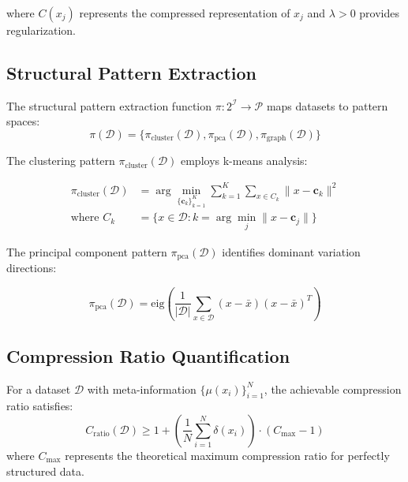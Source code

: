 where $C(x_j)$ represents the compressed representation of $x_j$ and $\lambda > 0$ provides regularization.

\subsection{Structural Pattern Extraction}

\begin{definition}
The structural pattern extraction function $\pi: 2^{\mathcal{I}} \to \mathcal{P}$ maps datasets to pattern spaces:
\begin{equation}
\pi(\mathcal{D}) = \{\pi_{\text{cluster}}(\mathcal{D}), \pi_{\text{pca}}(\mathcal{D}), \pi_{\text{graph}}(\mathcal{D})\}
\label{eq:structural-patterns}
\end{equation}
\end{definition}

The clustering pattern $\pi_{\text{cluster}}(\mathcal{D})$ employs k-means analysis:

\begin{align}
\pi_{\text{cluster}}(\mathcal{D}) &= \arg\min_{\{\mathbf{c}_k\}_{k=1}^K} \sum_{k=1}^K \sum_{x \in C_k} \|x - \mathbf{c}_k\|^2 \label{eq:kmeans-objective}\\
\text{where } C_k &= \{x \in \mathcal{D} : k = \arg\min_{j} \|x - \mathbf{c}_j\|\} \label{eq:cluster-assignment}
\end{align}

The principal component pattern $\pi_{\text{pca}}(\mathcal{D})$ identifies dominant variation directions:

\begin{equation}
\pi_{\text{pca}}(\mathcal{D}) = \text{eig}\left(\frac{1}{|\mathcal{D}|} \sum_{x \in \mathcal{D}} (x - \bar{x})(x - \bar{x})^T\right)
\label{eq:pca-pattern}
\end{equation}

\subsection{Compression Ratio Quantification}

\begin{theorem}
For a dataset $\mathcal{D}$ with meta-information $\{\mu(x_i)\}_{i=1}^N$, the achievable compression ratio satisfies:
\begin{equation}
C_{\text{ratio}}(\mathcal{D}) \geq 1 + \left(\frac{1}{N} \sum_{i=1}^N \delta(x_i)\right) \cdot (C_{\max} - 1)
\label{eq:compression-ratio-bound}
\end{equation}
where $C_{\max}$ represents the theoretical maximum compression ratio for perfectly structured data.
\end{theorem}

